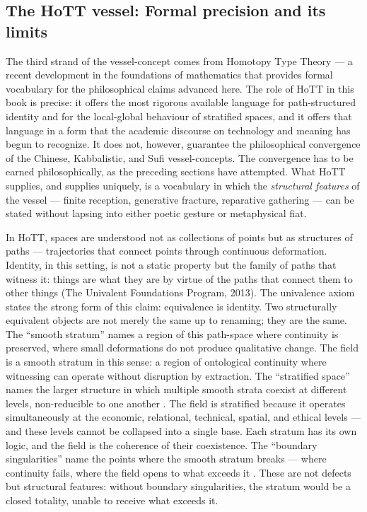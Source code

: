 \subsection{The HoTT vessel: Formal precision and its limits}

The third strand of the vessel-concept comes from Homotopy Type Theory --- a recent development in the foundations of mathematics that provides formal vocabulary for the philosophical claims advanced here. The role of HoTT in this book is precise: it offers the most rigorous available language for path-structured identity and for the local-global behaviour of stratified spaces, and it offers that language in a form that the academic discourse on technology and meaning has begun to recognize. It does not, however, guarantee the philosophical convergence of the Chinese, Kabbalistic, and Sufi vessel-concepts. The convergence has to be earned philosophically, as the preceding sections have attempted. What HoTT supplies, and supplies uniquely, is a vocabulary in which the \emph{structural features} of the vessel --- finite reception, generative fracture, reparative gathering --- can be stated without lapsing into either poetic gesture or metaphysical fiat.

In HoTT, spaces are understood not as collections of points but as structures of paths --- trajectories that connect points through continuous deformation. Identity, in this setting, is not a static property but the family of paths that witness it: things are what they are by virtue of the paths that connect them to other things (The Univalent Foundations Program, 2013). The univalence axiom states the strong form of this claim: equivalence is identity. Two structurally equivalent objects are not merely the same up to renaming; they are the same. The ``smooth stratum'' names a region of this path-space where continuity is preserved, where small deformations do not produce qualitative change. The field is a smooth stratum in this sense: a region of ontological continuity where witnessing can operate without disruption by extraction. The ``stratified space'' names the larger structure in which multiple smooth strata coexist at different levels, non-reducible to one another \cite{lurie_2009}. The field is stratified because it operates simultaneously at the economic, relational, technical, spatial, and ethical levels --- and these levels cannot be collapsed into a single base. Each stratum has its own logic, and the field is the coherence of their coexistence. The ``boundary singularities'' name the points where the smooth stratum breaks --- where continuity fails, where the field opens to what exceeds it \cite{schreiber_2011}. These are not defects but structural features: without boundary singularities, the stratum would be a closed totality, unable to receive what exceeds it.

